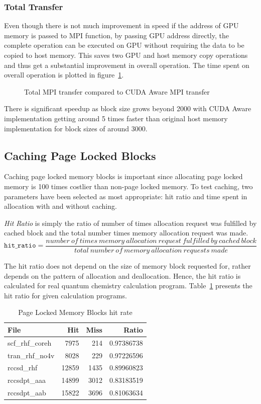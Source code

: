 \subsubsection{Total Transfer}
Even though there is not much improvement in speed if the address of GPU memory is
passed to MPI function, by passing GPU address directly, the complete operation
can be executed on GPU without requiring the data to be copied to host memory. This
saves two GPU and host memory copy operations and thus get a substantial improvement
in overall operation. The time spent on overall operation is plotted in
figure~\ref{fig:mempin_rdma_total}.

\begin{figure}[h]
  
  \caption{Total MPI transfer compared to CUDA Aware MPI transfer}
  \label{fig:mempin_rdma_total}
\end{figure}

There is significant speedup as block size grows beyond 2000 with CUDA Aware
implementation getting around 5 times faster than original host memory implementation
for block sizes of around 3000.

\subsection{Caching Page Locked Blocks}
Caching page locked memory blocks is important since allocating page locked memory
is 100 times costlier than non-page locked memory. To test caching, two parameters
have been selected as most appropriate: hit ratio and time spent in allocation with
and without caching.

\textit{Hit Ratio} is simply the ratio of number of times allocation request was
fulfilled by cached block and the total number times memory allocation request
was made.
\[
  \texttt{hit\_ratio} = \frac{number~of~times~memory~allocation~request~fulfilled~by~cached~block}{total~number~of~memory~allocation~requests~made}
\]

The hit ratio does not depend on the size of memory block requested for, rather
depends on the pattern of allocation and deallocation. Hence, the hit ratio is calculated
for real quantum chemistry calculation program. Table~\ref{tab:mempin_hitrate}
presents the hit ratio for given calculation programs.

\begin{table}[h]
  \centering
  \caption{Page Locked Memory Blocks hit rate}
  \begin{tabular}{l r r r}
    \hline
    File            & Hit   & Miss & Ratio      \\
    \hline
    scf\_rhf\_coreh &  7975 &  214 & 0.97386738 \\
    tran\_rhf\_no4v &  8028 &  229 & 0.97226596 \\
    rccsd\_rhf      & 12859 & 1435 & 0.89960823 \\
    rccsdpt\_aaa    & 14899 & 3012 & 0.83183519 \\
    rccsdpt\_aab    & 15822 & 3696 & 0.81063634 \\
    \hline
  \end{tabular}
  \label{tab:mempin_hitrate}
\end{table}

